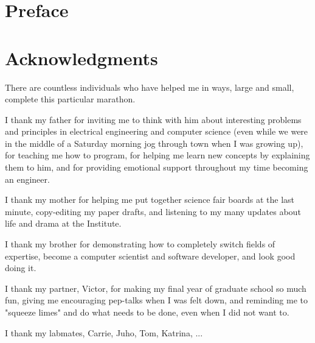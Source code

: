 \cleardoublepage

\section*{Preface}


\cleardoublepage

\section*{Acknowledgments}

There are countless individuals who have helped me in ways, large and small, complete this particular marathon. 

I thank my father for inviting me to think with him about interesting problems and principles in electrical engineering and computer science (even while we were in the middle of a Saturday morning jog through town when I was growing up), for teaching me how to program, for helping me learn new concepts by explaining them to him, and for providing emotional support throughout my time becoming an engineer. 

I thank my mother for helping me put together science fair boards at the last minute, copy-editing my paper drafts, and listening to my many updates about life and drama at the Institute.

I thank my brother for demonstrating how to completely switch fields of expertise, become a computer scientist and software developer, and look good doing it.

I thank my partner, Victor, for making my final year of graduate school so much fun, giving me encouraging pep-talks when I was felt down, and reminding me to "squeeze limes" and do what needs to be done, even when I did not want to.

I thank my labmates, Carrie, Juho, Tom, Katrina, ... 

